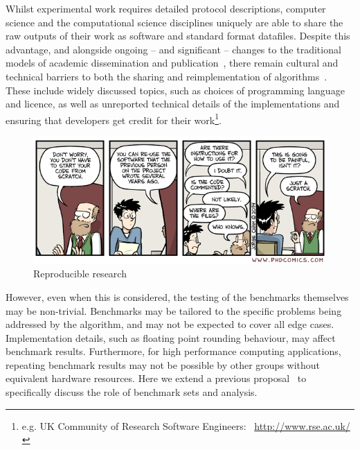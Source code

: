 \documentclass[conference]{IEEEtran}
\begin{document}
Whilst experimental work requires detailed protocol descriptions,
computer science and the computational science disciplines uniquely
are able to share the raw outputs of their work as software and
standard format datafiles. Despite this advantage, and alongside
ongoing -- and significant -- changes to the traditional models of
academic dissemination and
publication~\cite{deroure:2010,stodden-et-al:2013,fursin+dubach:2014},
there remain cultural and technical barriers to both the sharing and
reimplementation of algorithms~\cite{crick-et-al_wssspe2}. These
include widely discussed topics, such as choices of programming
language and licence, as well as unreported technical details of the
implementations and ensuring that developers get credit for their
work\footnote{e.g. UK Community of Research Software Engineers:
  ~\url{http://www.rse.ac.uk/}}.


\begin{figure}[!ht]
\centering
\includegraphics[width=\columnwidth]{phd031214s.png}
\caption{Reproducible research\newline [source: \url{http://www.phdcomics.com/comics.php?f=1689}]}
\label{fig:reprodres} 
\end{figure}

However, even when this is considered, the testing of the benchmarks
themselves may be non-trivial. Benchmarks may be tailored to the
specific problems being addressed by the algorithm, and may not be
expected to cover all edge cases. Implementation details, such as
floating point rounding behaviour, may affect benchmark results.
Furthermore, for high performance computing applications, repeating
benchmark results may not be possible by other groups without
equivalent hardware resources. Here we extend a previous
proposal~\cite{crick-et-al_wssspe2} to specifically discuss the role
of benchmark sets and analysis.
\end{document}
